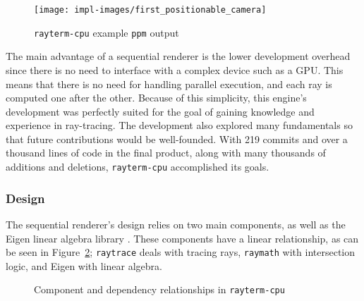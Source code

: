 \vspace{0.3em}
\begin{figure}[htb]
  \centering
  \texttt{[image: impl-images/first\_positionable\_camera]}
  \caption{\texttt{rayterm-cpu} example \texttt{ppm} output}
\label{fig:rayterm-cpu_ppm}
\end{figure}

The main advantage of a sequential renderer is the lower development overhead since there is no need to interface with a complex device such as a GPU.
This means that there is no need for handling parallel execution, and each ray is computed one after the other.
Because of this simplicity, this engine's development was perfectly suited for the goal of gaining knowledge and experience in ray-tracing.
The development also explored many fundamentals so that future contributions would be well-founded.
With 219 commits and over a thousand lines of code in the final product, along with many thousands of additions and deletions, \texttt{rayterm-cpu} accomplished its goals.

\subsubsection{Design} \label{ch:methods:renderer:sequential:design}

The sequential renderer's design relies on two main components, as well as the Eigen linear algebra library \cite{eigenweb}.
These components have a linear relationship, as can be seen in Figure~\ref{fig:rayterm-cpu_components}; \texttt{raytrace} deals with tracing rays, \texttt{raymath} with intersection logic, and Eigen with linear algebra.

\vspace{0.3em}
\begin{figure}[htb]
  \centering
  \caption{Component and dependency relationships in \texttt{rayterm-cpu}}
\label{fig:rayterm-cpu_components}
\end{figure}

